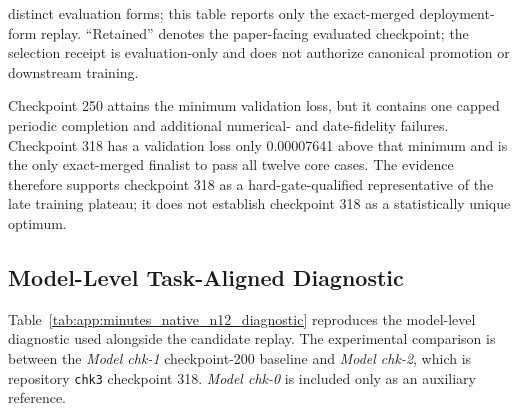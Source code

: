 \begin{table}[htbp]
\begin{minipage}{0.97\textwidth}
        distinct evaluation forms; this table reports only the exact-merged
        deployment-form replay. ``Retained'' denotes the paper-facing evaluated
        checkpoint; the selection receipt is evaluation-only and does not
        authorize canonical promotion or downstream training.
    \end{minipage}
    \caption{Exact-merged checkpoint-selection hard gates for \textit{Model
    chk-2} (repository artifact \texttt{chk3}). Checkpoint 318 is retained
    because it is the only finalist that passes all twelve task-aligned cases,
    despite checkpoint 250 having a marginally lower evaluation loss.}
    \label{tab:app:chk2_exact_merged_n12_selection}
\end{table}

Checkpoint 250 attains the minimum validation loss, but it contains one capped
periodic completion and additional numerical- and date-fidelity failures.
Checkpoint 318 has a validation loss only 0.00007641 above that minimum and is the
only exact-merged finalist to pass all twelve core cases. The evidence therefore
supports checkpoint 318 as a hard-gate-qualified representative of the late
training plateau; it does not establish checkpoint 318 as a statistically
unique optimum.

\subsection*{Model-Level Task-Aligned Diagnostic}

Table~\ref{tab:app:minutes_native_n12_diagnostic} reproduces the model-level
diagnostic used alongside the candidate replay. The experimental comparison is
between the \textit{Model chk-1} checkpoint-200 baseline and \textit{Model
chk-2}, which is repository \texttt{chk3} checkpoint 318. \textit{Model chk-0}
is included only as an auxiliary reference.

